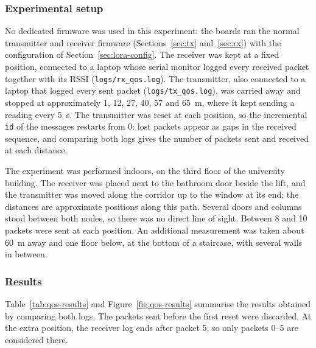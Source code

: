 \documentclass[informe,english]{plantilla}
\begin{document}
\subsubsection{Experimental setup}

No dedicated firmware was used in this experiment: the boards ran the normal transmitter and receiver firmware (Sections~\ref{sec:tx} and~\ref{sec:rx}) with the configuration of Section~\ref{sec:lora-config}. The receiver was kept at a fixed position, connected to a laptop whose serial monitor logged every received packet together with its RSSI (\texttt{logs/rx\_qos.log}). The transmitter, also connected to a laptop that logged every sent packet (\texttt{logs/tx\_qos.log}), was carried away and stopped at approximately 1, 12, 27, 40, 57 and 65~m, where it kept sending a reading every 5~s. The transmitter was reset at each position, so the incremental \texttt{id} of the messages restarts from 0: lost packets appear as gaps in the received sequence, and comparing both logs gives the number of packets sent and received at each distance.

The experiment was performed indoors, on the third floor of the university building. The receiver was placed next to the bathroom door beside the lift, and the transmitter was moved along the corridor up to the window at its end; the distances are approximate positions along this path. Several doors and columns stood between both nodes, so there was no direct line of sight. Between 8 and 10 packets were sent at each position. An additional measurement was taken about 60~m away and one floor below, at the bottom of a staircase, with several walls in between.


\subsubsection{Results}

Table~\ref{tab:qos-results} and Figure~\ref{fig:qos-results} summarise the results obtained by comparing both logs. The packets sent before the first reset were discarded. At the extra position, the receiver log ends after packet 5, so only packets 0--5 are considered there.
\end{document}
